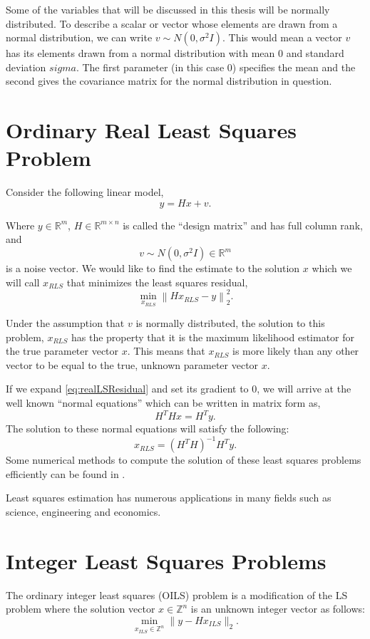 \documentclass[12pt,Bold,letterpaper]{mcgilletdclass}
\newcommand{\be}{\begin{equation}}
\newcommand{\ee}{\end{equation}}
\newcommand{\vsp}{\vspace{\baselineskip}}
\begin{document}
Some of the variables that will be discussed in this thesis will be normally distributed. To describe a scalar or vector whose elements are drawn from a normal distribution, we can write $v \sim N(0,\sigma^2I)$. This would mean a vector $v$ has its elements drawn from a normal distribution with mean $0$ and standard deviation $sigma$. The first parameter (in this case $0$) specifies the mean and the second gives the covariance matrix for the normal distribution in question.

\section{Ordinary Real Least Squares Problem}
Consider the following linear model,
\begin{equation}
\label{eq:realLSModel}
y = Hx+v.
\end{equation}

Where $y\in\mathbb{R}^m$, $H\in\mathbb{R}^{m \times n}$ is called the
``design matrix'' and has full column rank, and $$v \sim N(0,\sigma^2I) \in\mathbb{R}^m$$ is a
noise vector. We would like to find the estimate to the solution $x$ which we will call
$x_{\scriptscriptstyle{RLS}}$ that minimizes the least squares residual,
\be
\label{eq:realLSResidual}
	\min_{x_{\scriptscriptstyle{RLS}}} \left \| Hx_{\scriptscriptstyle{RLS}} - y \right \|^2_2.
\ee

Under the assumption that $v$ is normally distributed, the solution to this problem, $x_{\scriptscriptstyle{RLS}}$ has the property that it is the maximum likelihood estimator for the true parameter vector $x$. This means that $x_{\scriptscriptstyle{RLS}}$ is more likely than any other vector to be equal to the true, unknown parameter vector $x$. 

If we expand \eqref{eq:realLSResidual} and set its gradient to $0$, we will arrive at the
well known ``normal equations'' which can be written in matrix form as,
\begin{equation}
H^THx = H^Ty.
\label{eq:normalEquations}
\end{equation}
The solution to these normal equations will satisfy the following:
$$x_{\scriptscriptstyle{RLS}} = (H^TH)^{-1}H^Ty.$$
Some numerical methods to compute the solution of these least squares problems efficiently can be found in \cite{Bjo96}.

Least squares estimation has numerous applications in many fields such as science, engineering and economics.

\vsp \section{Integer Least Squares Problems}
The ordinary integer least squares (OILS) problem is a modification of the LS problem
where the solution vector $x\in\mathbb{Z}^n$ is an unknown integer vector as follows: 
\be
\label{eq:ils0}
\min_{x_{\scriptscriptstyle{ILS}}\in {\mathbb{Z}}^n}  \| y- Hx_{\scriptscriptstyle{ILS}} \|_2. 
\ee
\end{document}
